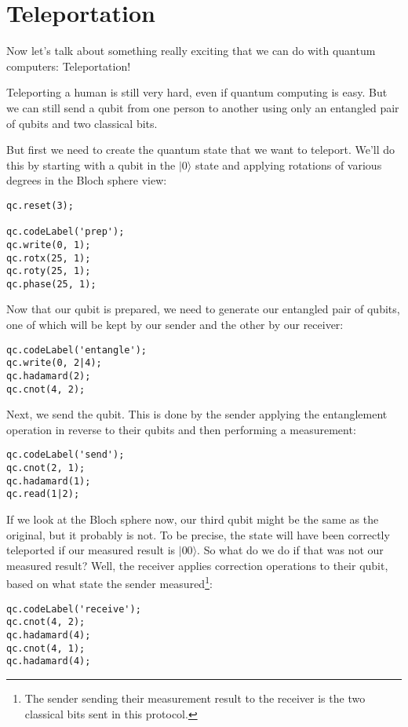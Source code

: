 \documentclass[twocolumn]{article}
\begin{document}
\section{Teleportation}

Now let's talk about something really exciting that we can do with quantum computers: Teleportation!

Teleporting a human is still very hard, even if quantum computing is easy. But we can still send a qubit from one person to another using only an entangled pair of qubits and two classical bits.

But first we need to create the quantum state that we want to teleport. We'll do this by starting with a qubit in the $|0\rangle$ state and applying rotations of various degrees in the Bloch sphere view:

\begin{lstlisting}
qc.reset(3);

qc.codeLabel('prep');
qc.write(0, 1);
qc.rotx(25, 1);
qc.roty(25, 1);
qc.phase(25, 1);
\end{lstlisting}

Now that our qubit is prepared, we need to generate our entangled pair of qubits, one of which will be kept by our sender and the other by our receiver:

\begin{lstlisting}
qc.codeLabel('entangle');
qc.write(0, 2|4);
qc.hadamard(2);
qc.cnot(4, 2);
\end{lstlisting}

Next, we send the qubit. This is done by the sender applying the entanglement operation in reverse to their qubits and then performing a measurement:

\begin{lstlisting}
qc.codeLabel('send');
qc.cnot(2, 1);
qc.hadamard(1);
qc.read(1|2);
\end{lstlisting}

If we look at the Bloch sphere now, our third qubit might be the same as the original, but it probably is not. To be precise, the state will have been correctly teleported if our measured result is $|00\rangle$. So what do we do if that was not our measured result? Well, the receiver applies correction operations to their qubit, based on what state the sender measured\footnote{The sender sending their measurement result to the receiver is the two classical bits sent in this protocol.}:

\begin{lstlisting}
qc.codeLabel('receive');
qc.cnot(4, 2);
qc.hadamard(4);
qc.cnot(4, 1);
qc.hadamard(4);
\end{lstlisting}
\end{document}
